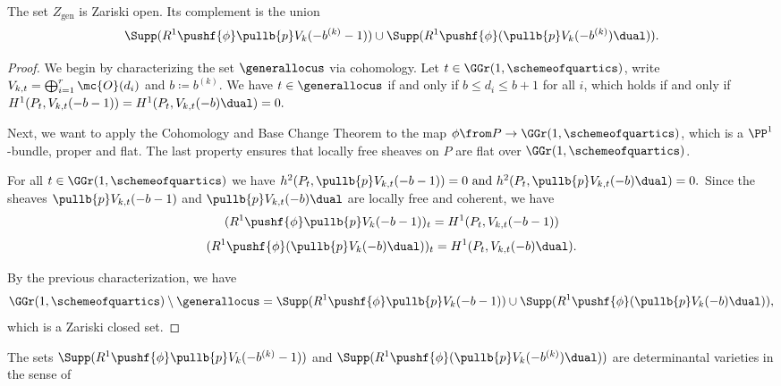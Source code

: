 
\begin{proposition}
	The set $Z_{\text{gen}}$ is Zariski open. Its complement is the union
	\[
		\Supp(R^1 \pushf{\phi}\pullb{p} V_{k}(-b^{(k)}-1)) \cup
		\Supp(R^1 \pushf{\phi}(\pullb{p} V_{k}(-b^{(k)})\dual)).
	\]
\end{proposition}
\begin{proof}
	We begin by characterizing the set $\generallocus$ via cohomology. Let $t\in \GGr(1,\schemeofquartics)$, write $V_{k,t}=\bigoplus_{i=1}^r \mc{O}(d_i)$ and $b\coloneqq b^{(k)}$. We have $t\in \generallocus$ if and only if $b\leq d_i \leq b+1$ for all $i$, which holds if and only if
	$
	H^1(P_t, V_{k,t}(-b-1))
	=
	H^1(P_t, V_{k,t}(-b)\dual)
	=0.
	$

	Next, we want to apply the Cohomology and Base Change Theorem \cite[{}28.1.6]{vakil-algebraic-geometry} to the map 
	$\phi \from P \to \GGr(1,\schemeofquartics)$, which is a $\PP^1$-bundle, proper and flat. The last property ensures that locally free sheaves on $P$ are flat over $\GGr(1,\schemeofquartics)$.

	For all $t\in \GGr(1,\schemeofquartics)$ we have
	$
	h^2(P_t, \pullb{p}V_{k,t}(-b-1)) = 0
	\text{ and }
	h^2(P_t,\pullb{p}V_{k,t}(-b)\dual)=0.
	$
	Since the sheaves $\pullb{p}V_{k,t}(-b-1)$ and $\pullb{p}V_{k,t}(-b)\dual$ are locally free and coherent, we have 
	\[(R^1 \pushf{\phi}\pullb{p} V_{k}(-b-1))_t = H^1(P_t,V_{k,t}(-b-1))\]
	\[
	(R^1 \pushf{\phi}(\pullb{p} V_{k}(-b)\dual))_t = H^1(P_t,V_{k,t}(-b)\dual).
	\]

	By the previous characterization, we have
	\[
		\GGr(1,\schemeofquartics) \setminus \generallocus =
		\Supp(R^1 \pushf{\phi}\pullb{p} V_{k}(-b-1)) \cup
		\Supp(R^1 \pushf{\phi}(\pullb{p} V_{k}(-b)\dual)),
	\]
	which is a Zariski closed set.
\end{proof}
\begin{proposition} \label{supp-are-det-varieties}
The sets
$\Supp(R^1 \pushf{\phi}\pullb{p} V_{k}(-b^{(k)}-1))$ and
$\Supp(R^1 \pushf{\phi}(\pullb{p} V_{k}(-b^{(k)})\dual))$ 
are determinantal varieties in the sense of \cite[Ch.~II, §4]{arbarello-geometry-algebraic-curves}
\end{proposition}
